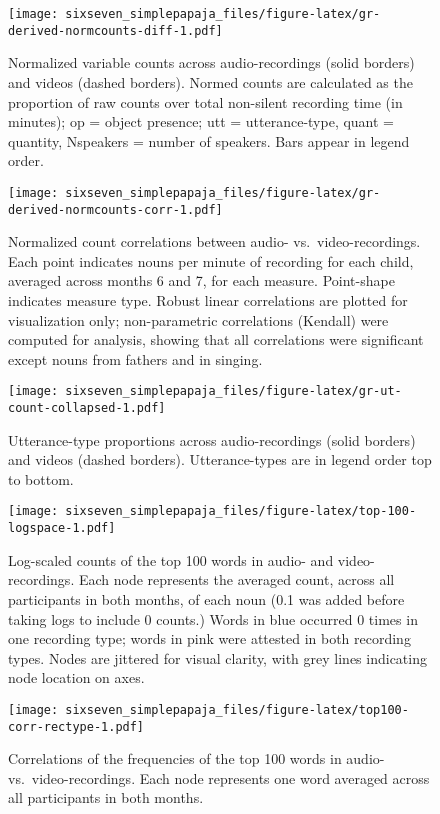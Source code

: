 \documentclass[man]{apa6}
\theoremstyle{definition}
\theoremstyle{definition}
\theoremstyle{definition}
\theoremstyle{remark}
\begin{document}
\begin{figure}
\centering
\texttt{[image: sixseven\_simplepapaja\_files/figure-latex/gr-derived-normcounts-diff-1.pdf]}
\caption{\label{fig:gr-derived-normcounts-diff}Normalized variable counts
across audio-recordings (solid borders) and videos (dashed borders).
Normed counts are calculated as the proportion of raw counts over total
non-silent recording time (in minutes); op = object presence; utt =
utterance-type, quant = quantity, Nspeakers = number of speakers. Bars
appear in legend order.}
\end{figure}

\begin{figure}
\centering
\texttt{[image: sixseven\_simplepapaja\_files/figure-latex/gr-derived-normcounts-corr-1.pdf]}
\caption{\label{fig:gr-derived-normcounts-corr}Normalized count correlations
between audio- vs.~video-recordings. Each point indicates nouns per
minute of recording for each child, averaged across months 6 and 7, for
each measure. Point-shape indicates measure type. Robust linear
correlations are plotted for visualization only; non-parametric
correlations (Kendall) were computed for analysis, showing that all
correlations were significant except nouns from fathers and in singing.}
\end{figure}

\begin{figure}
\centering
\texttt{[image: sixseven\_simplepapaja\_files/figure-latex/gr-ut-count-collapsed-1.pdf]}
\caption{\label{fig:gr-ut-count-collapsed}Utterance-type proportions across
audio-recordings (solid borders) and videos (dashed borders).
Utterance-types are in legend order top to bottom.}
\end{figure}

\begin{figure}
\centering
\texttt{[image: sixseven\_simplepapaja\_files/figure-latex/top-100-logspace-1.pdf]}
\caption{\label{fig:top-100-logspace}Log-scaled counts of the top 100 words
in audio- and video-recordings. Each node represents the averaged count,
across all participants in both months, of each noun (0.1 was added
before taking logs to include 0 counts.) Words in blue occurred 0 times
in one recording type; words in pink were attested in both recording
types. Nodes are jittered for visual clarity, with grey lines indicating
node location on axes.}
\end{figure}

\begin{figure}
\centering
\texttt{[image: sixseven\_simplepapaja\_files/figure-latex/top100-corr-rectype-1.pdf]}
\caption{\label{fig:top100-corr-rectype}Correlations of the frequencies of
the top 100 words in audio- vs.~video-recordings. Each node represents
one word averaged across all participants in both months.}
\end{figure}
\end{document}
